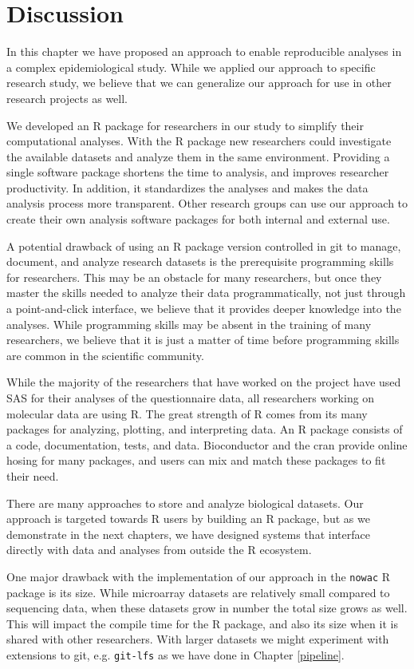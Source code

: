 \section{Discussion}
In this chapter we have proposed an approach to enable reproducible analyses in
a complex epidemiological study. While we applied our approach to specific
research study, we believe that we can generalize our approach for use in other
research projects as well. 

We developed an R package for researchers in our study to simplify their
computational analyses. With the R package new researchers could investigate the
available datasets and analyze them in the same environment. Providing a single
software package shortens the time to analysis, and improves researcher
productivity. In addition, it standardizes the analyses and makes the data
analysis process more transparent. Other research groups can use our approach to
create their own analysis software packages for both internal and external use. 

A potential drawback of using an R package version controlled in git to manage,
document, and analyze research datasets is the prerequisite programming
skills for researchers. This may be an obstacle for many researchers, but
once they master the skills needed to analyze their data programmatically, not
just through a point-and-click interface, we believe that it provides deeper
knowledge into the analyses. While programming skills may be absent in the
training of many researchers, we believe that it is just a matter of time before
programming skills are common in the scientific community. 

While the majority of the researchers that have worked on the project have used
SAS for their analyses of the questionnaire data, all researchers working on
molecular data are using R. The great strength of R comes from its many
packages for analyzing, plotting, and interpreting data. An R package consists
of a code, documentation, tests, and data.  Bioconductor\cite{bioconductor} and
the \gls{cran}\cite{cran} provide online hosing for many packages, and users can
mix and match these packages to fit their need. 

There are many approaches to store and analyze biological datasets. Our approach
is targeted towards R users by building an R package, but as we demonstrate in
the next chapters, we have designed systems that interface directly with data
and analyses from outside the R ecosystem. 

One major drawback with the implementation of our approach in the \texttt{nowac}
R package is its size. While microarray datasets are relatively small compared
to sequencing data, when these datasets grow in number the total size grows as
well. This will impact the compile time for the R package, and also its size
when it is shared with other researchers. With larger datasets we might
experiment with extensions to git, e.g. \texttt{git-lfs} as we have done in
Chapter \ref{pipeline}.

